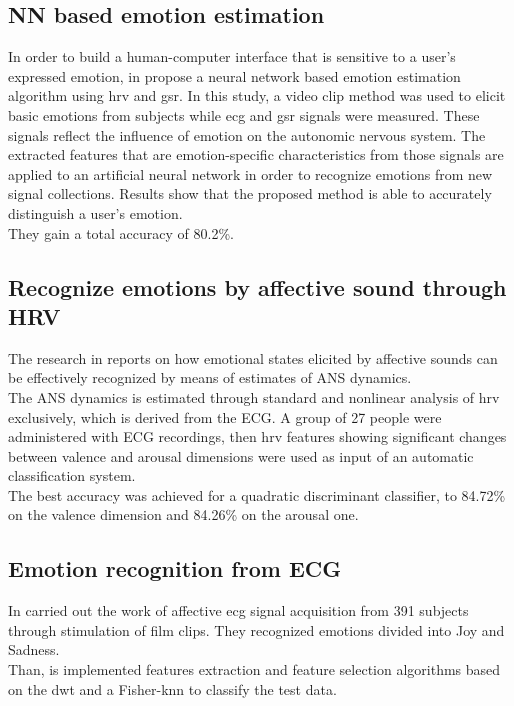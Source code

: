 \subsection{NN based emotion estimation}
In order to build a human-computer interface that is sensitive to a user's expressed emotion, in \cite{yoo2005neural} propose a neural network based emotion estimation algorithm using \gls{hrv} and \gls{gsr}. In this study, a video clip method was used to elicit basic emotions from subjects while \gls{ecg} and \gls{gsr} signals were measured. These signals reflect the influence of emotion on the autonomic nervous system. The extracted features that are emotion-specific characteristics from those signals are applied to an artificial neural network in order to recognize emotions from new signal collections. Results show that the proposed method is able to accurately distinguish a user's emotion.
\\ They gain a total accuracy of 80.2\%.

\subsection{Recognize emotions by affective sound through HRV}
The research in \cite{nardelli2015recognizing} reports on how emotional states elicited by affective sounds can be effectively recognized by means of estimates of ANS dynamics.
\\ \indent
The ANS dynamics is estimated through standard and nonlinear analysis of \gls{hrv} exclusively, which is derived from the ECG. A group of 27 people were administered with ECG recordings, then \gls{hrv} features showing significant changes between valence and arousal dimensions were used as input of an automatic classification system.
\\ \indent
The best accuracy was achieved for a quadratic discriminant classifier, to 84.72\% on the valence dimension and 84.26\% on the arousal one. 

\subsection{Emotion recognition from ECG}
In \cite{cai2009research} carried out the work of affective \gls{ecg} signal acquisition from 391 subjects through stimulation of film clips. They recognized emotions divided into Joy and Sadness.
\\
Than, is implemented features extraction and feature selection algorithms based on the \gls{dwt} and a Fisher-\gls{knn} to classify the test data.

